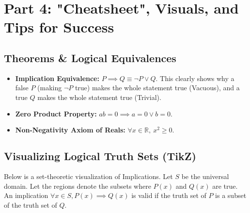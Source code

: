 \documentclass[11pt]{article}
\theoremstyle{remark}
\begin{document}
\newpage
\section{Part 4: "Cheatsheet", Visuals, and Tips for Success}

\subsection{Theorems \& Logical Equivalences}
\begin{itemize}
    \item \textbf{Implication Equivalence:} $P \implies Q \equiv \neg P \lor Q$. This clearly shows why a false $P$ (making $\neg P$ true) makes the whole statement true (Vacuous), and a true $Q$ makes the whole statement true (Trivial).
    \item \textbf{Zero Product Property:} $ab = 0 \implies a = 0 \lor b = 0$.
    \item \textbf{Non-Negativity Axiom of Reals:} $\forall x \in \mathbb{R}, \ x^2 \ge 0$.
\end{itemize}

\subsection{Visualizing Logical Truth Sets (TikZ)}

Below is a set-theoretic visualization of Implications. Let $S$ be the universal domain. Let the regions denote the subsets where $P(x)$ and $Q(x)$ are true. An implication $\forall x \in S, P(x) \implies Q(x)$ is valid if the truth set of $P$ is a subset of the truth set of $Q$.
\end{document}
